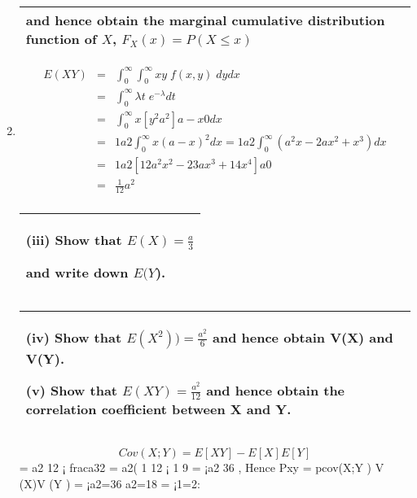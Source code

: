 \documentclass[a4paper,12pt]{article}
\begin{document}
\begin{enumerate}
\begin{table}[ht!]
\begin{tabular}{|p{15cm}|}
 and hence obtain the marginal cumulative distribution function of $X$, $F_X(x) = P(X \leq x)$\\
\hline

      \end{tabular}
    \end{table}

\item 

\begin{eqnarray}
E(XY) &=& \int^{\infty}_{0} \int^{\infty}_{0} xy\; f(x,y) \; dydx \\
    &=&\int^{\infty}_{0} \lambda t\;e^{-\lambda} dt \\
&=&
\int^{\infty}_{0} x[ y^2
a^2 ]a-x
0 dx \\ &=& 1
a2
\int^{\infty}_{0} x(a - x)^2dx = 1
a2
\int^{\infty}_{0}(a^2x - 2ax^2 + x^3)dx\\
&=& 1
a2 [ 1
2a^2x^2 - 2
3ax^3 + 1
4x^4]a
0\\ &=& \frac{1}{12}a^2\\
\end{eqnarray}
\newpage
  \begin{table}[ht!]
     \centering
     \begin{tabular}{|p{15cm}|}
     \hline    
(iii) Show that $E(X) = \frac{a}{3}$

 and write down $E(Y$).         
\\ \hline
\end{tabular}
\end{table}

  \begin{table}[ht!]
     \centering
     \begin{tabular}{|p{15cm}|}
     \hline  
 (iv) Show that $E(X^2)) = \frac{a^2}{6}$
and hence obtain V(X) and V(Y).       
 
(v) Show that $E(XY) = \frac{a^2}{12}$
and hence obtain the correlation coefficient 
between X and Y.\\ \hline
\end{tabular}
\end{table}
\[Cov(X; Y ) = E[XY ] - E[X]E[Y ]\] = a2
12 ¡ fraca32 = a2( 1
12 ¡ 1
9 = ¡a2
36 ,
Hence Pxy = pcov(X;Y )
V (X)V (Y )
= ¡a2=36
a2=18 = ¡1=2:
\end{enumerate}
\end{document}
